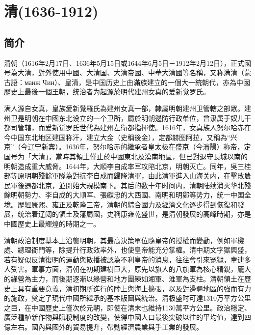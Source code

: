 
\chapter{清\tiny(1636-1912)}

\section{简介}

清朝（1616年2月17日、1636年5月15日或1644年6月5日－1912年2月12日），正式國号為大清，對外使用中國、大清国、大清帝國、中華大清國等名稱，又称满清（蒙古語：манж Чин）、皇清，是中国历史上由滿族建立的一個大一統朝代，亦為中國歷史上最後一個王朝，统治者为起源於明代建州女真的爱新觉罗氏。

满人源自女真，皇族愛新覺羅氏為建州女真一部，隸屬明朝建州卫管轄之部眾。建州卫是明朝在中國东北设立的一个卫所，屬於明朝邊防行政单位，曾隶属于奴儿干都司管辖，而爱新觉罗氏世代為建州左衛都指揮使。1616年，女真族人努尔哈赤在今中国东北地区建国称汗，建立大金（史稱後金），定都赫图阿拉，又稱為“兴京”（今辽宁新宾）。1636年，努尔哈赤的繼承者皇太极在盛京（今瀋陽）称帝，定国号为「大清」，當時其領土僅止於中國東北及漠南地區，但已對退守長城以南的明朝造成重大威脅。1644年，大順李自成率军攻陷北京，明朝灭亡。同年，吳三桂部等原明朝殘餘軍隊為對抗李自成而歸降清軍，由此清軍進入山海关内，在擊敗農民軍後遷都北京，並開始大規模南下。其后的数十年时间内，清朝陆续消灭华北殘餘明朝勢力、李自成的大順军、張獻忠的大西國、南明和明鄭等势力，统一中国全境。歷經康熙、雍正及乾隆三帝，清朝的綜合國力及經濟文化逐步得到恢復和發展，统治着辽阔的領土及藩屬國，史稱康雍乾盛世，是清朝發展的高峰時期，亦是中國歷史上最輝煌的時期之一。

清朝政治制度基本上沿襲明朝，其最高決策單位隨皇帝的授權而變動，例如軍機處、總理衙門等，除提升行政效率外，也使皇帝能充分掌權。清中期文字獄興盛，若有疑似反清復明的運動與散播被認為不利皇帝的消息，往往會引來冤獄，牽連多人受害。軍事方面，清朝在初期建樹巨大，原先以旗人的八旗軍為核心精銳，龐大的綠營為主力，而後期逐漸以綠營和地方團練如湘軍、淮軍為支柱。清朝領土在歷史上具有重要意義，清初期所進行的陸上與海上擴張，以及對邊疆地區的強而有力的施政，奠定了現代中國所繼承的基本版圖與統治。清极盛时可達1310万平方公里之巨，在中國歷史上僅次於元朝，即使在清末也維持1130萬平方公里。政治穩定、廣泛種植新作物與賦稅制度的改變，使得中國人口最後突破以往的平均值，達到四億左右。國內與國外的貿易提升，帶動經濟農業與手工業的發展。

